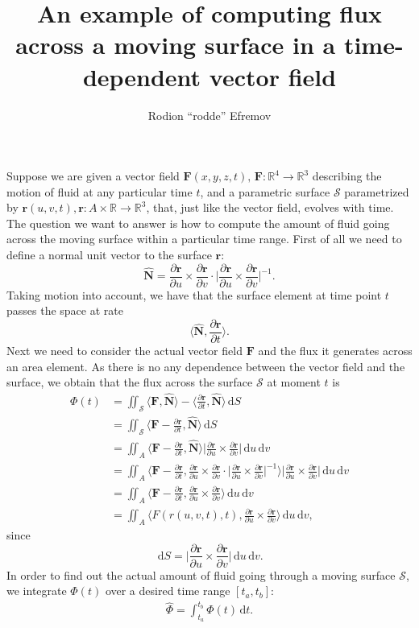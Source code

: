 \documentclass[12pt]{article}
\title{An example of computing flux across a moving surface in a time-dependent vector field}
\author{Rodion ``rodde'' Efremov}
\newcommand{\F}{\mathbf{F}}
\newcommand{\FF}{\hat{\Phi}}
\newcommand{\surf}{\mathbf{r}}
\newcommand{\N}{\hat{\mathbf{N}}}
\newcommand{\R}{\mathbb{R}}
\newcommand{\dr}{\partial \surf}
\newcommand{\du}{\partial u}
\newcommand{\dv}{\partial v}
\newcommand{\dt}{\partial t}
\newcommand{\dru}{\frac{\dr}{\du}}
\newcommand{\drv}{\frac{\dr}{\dv}}
\newcommand{\drt}{\frac{\dr}{\dt}}
\newcommand{\dS}{\,\mathrm{d}S}
\newcommand{\ddt}{\,\mathrm{d}t}
\newcommand{\ddu}{\, \mathrm{d}u}
\newcommand{\ddv}{\, \mathrm{d}v}
\begin{document}
 \maketitle

\noindent Suppose we are given a vector field $\F(x, y, z, t), \, \F \colon \R^4 \to \R^3$ describing the motion of fluid at any particular time $t$, and a parametric surface $\mathscr{S}$ parametrized by $\surf (u, v, t), \surf \colon A \times \R \to \R^3$, that, just like the vector field, evolves with time. The question we want to answer is how to compute the amount of fluid going across the moving surface within a particular time range. First of all we need to define a normal unit vector to the surface $\surf$:
\[
\N = \dru \times \drv \cdot \Bigg| \dru \times \drv \Bigg|^{-1}.
\]
Taking motion into account, we have that the surface element at time point $t$ passes the space at rate 
\[
\Big\langle \N , \drt \Big\rangle.
\]
Next we need to consider the actual vector field $\F$ and the flux it generates across an area element. As there is no any dependence between the vector field and the surface, we obtain that the flux across the surface $\mathscr{S}$ at moment $t$ is
\begin{align*}
\Phi(t) &= \iint_{\mathscr{S}} \langle \F, \N \rangle - \langle \drt, \N \rangle \dS \\
		   &= \iint_{\mathscr{S}} \langle \F - \drt, \N \rangle \dS \\
		   &= \iint_A \langle \F - \drt, \N \rangle \Bigg| \dru \times \drv \Bigg| \ddu \ddv \\ 
		   &= \iint_A \Bigg\langle \F - \drt, \dru \times \drv \cdot \Bigg| \dru \times \drv \Bigg|^{-1} \Bigg\rangle \Bigg| \dru \times \drv \Bigg| \ddu \ddv \\ 
		   &= \iint_A \Bigg\langle \F - \drt, \dru \times \drv \Bigg\rangle \ddu \ddv \\
		   &= \iint_A \Bigg\langle F(r(u, v, t), t), \dru \times \drv \Bigg\rangle \ddu \ddv,
\end{align*}
since
\[
\dS = \Bigg| \dru \times \drv \Bigg| \ddu \ddv.
\]
In order to find out the actual amount of fluid going through a moving surface $\mathscr{S}$, we integrate $\Phi(t)$ over a desired time range $\left[ t_a, t_b \right]$:
\begin{align*}
\FF = \int_{t_a}^{t_b} \Phi(t) \ddt.
\end{align*}
\end{document}
